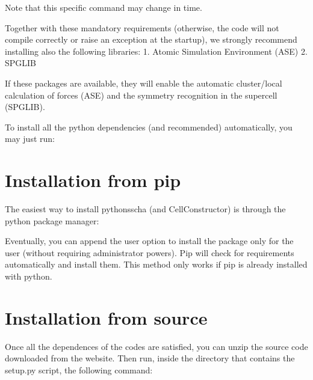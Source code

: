 \documentclass[a4paper,11pt,english]{sphinxmanual}
\begin{document}
\sphinxAtStartPar
Note that this specific command may change in time.

\sphinxAtStartPar
Together with these mandatory requirements (otherwise, the code will not compile correctly or raise an exception at the startup), we
strongly recommend installing also the following libraries:
1. Atomic Simulation Environment (ASE)
2. SPGLIB

\sphinxAtStartPar
If these packages are available, they will enable the automatic cluster/local calculation of forces (ASE) and the symmetry recognition in the supercell (SPGLIB).

\sphinxAtStartPar
To install all the python dependencies (and recommended) automatically, you may just run:

\begin{sphinxVerbatim}[commandchars=\\\{\}]
\end{sphinxVerbatim}


\section{Installation from pip}
\label{\detokenize{install:installation-from-pip}}
\sphinxAtStartPar
The easiest way to install python\sphinxhyphen{}sscha (and CellConstructor) is through the python package manager:

\begin{sphinxVerbatim}[commandchars=\\\{\}]
\end{sphinxVerbatim}

\sphinxAtStartPar
Eventually, you can append the \textendash{}user option to install the package only for the user (without requiring administrator powers).
Pip will check for requirements automatically and install them. This method only works if pip is already installed with python.


\section{Installation from source}
\label{\detokenize{install:installation-from-source}}
\sphinxAtStartPar
Once all the dependences of the codes are satisfied, you can unzip the source code downloaded from the website.
Then run, inside the directory that contains the setup.py script, the following command:

\begin{sphinxVerbatim}[commandchars=\\\{\}]
\end{sphinxVerbatim}
\end{document}
